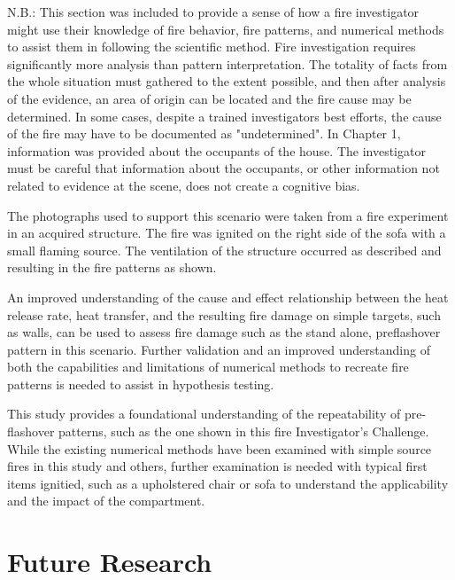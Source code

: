\documentclass[twoside]{uocthesis}
\begin{document}
{N.B.: This section was included to provide a sense of how a fire investigator might use their knowledge of fire behavior, fire patterns, and numerical methods to assist them in following the scientific method.  Fire investigation requires significantly more analysis than pattern interpretation.  The totality of facts from the whole situation must gathered to the extent possible, and then after analysis of the evidence, an area of origin can be located and the fire cause may be determined.  In some cases, despite a trained investigators best efforts, the cause of the fire may have to be documented as "undetermined".  In Chapter 1, information was provided about the occupants of the house.  The investigator must be careful that information about the occupants, or other information not related to evidence at the scene, does not create a cognitive bias.  

The photographs used to support this scenario were taken from a fire experiment in an acquired structure.  The fire was ignited on the right side of the sofa with a small flaming source.  The ventilation of the structure occurred as described and resulting in the fire patterns as shown. 

An improved understanding of the cause and effect relationship between the heat release rate, heat transfer, and the resulting fire damage on simple targets, such as walls, can be used to assess fire damage such as the stand alone, preflashover pattern in this scenario.  Further validation and an improved understanding of both the capabilities and limitations of numerical methods to recreate fire patterns is needed to assist in hypothesis testing.  

This study provides a foundational understanding of the repeatability of pre-flashover patterns, such as the one shown in this fire Investigator's Challenge.  While the existing numerical methods have been examined with simple source fires in this study and others, further examination is needed with typical first items ignitied, such as a upholstered chair or sofa to understand the applicability and the impact of the compartment. 

\chapter{Future Research}

}
\end{document}

